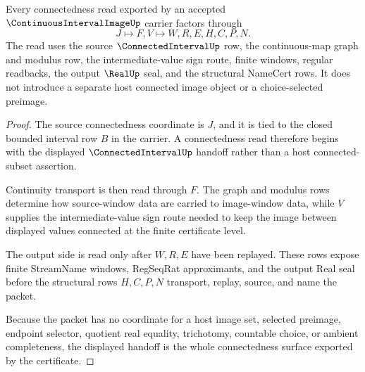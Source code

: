 \begin{theorem}
\label{thm:continuous-interval-image-connected-handoff}
Every connectedness read exported by an accepted $\ContinuousIntervalImageUp$ carrier factors through
$$
J \longmapsto F,V \longmapsto W,R,E,H,C,P,N .
$$
The read uses the source $\ConnectedIntervalUp$ row, the continuous-map graph and modulus row, the intermediate-value sign route, finite windows, regular readbacks, the output $\RealUp$ seal, and the structural NameCert rows. It does not introduce a separate host connected image object or a choice-selected preimage.
\end{theorem}
\begin{proof}
The source connectedness coordinate is $J$, and it is tied to the closed bounded interval row $B$ in the carrier. A connectedness read therefore begins with the displayed $\ConnectedIntervalUp$ handoff rather than a host connected-subset assertion.

Continuity transport is then read through $F$. The graph and modulus rows determine how source-window data are carried to image-window data, while $V$ supplies the intermediate-value sign route needed to keep the image between displayed values connected at the finite certificate level.

The output side is read only after $W,R,E$ have been replayed. These rows expose finite StreamName windows, RegSeqRat approximants, and the output Real seal before the structural rows $H,C,P,N$ transport, replay, source, and name the packet.

Because the packet has no coordinate for a host image set, selected preimage, endpoint selector, quotient real equality, trichotomy, countable choice, or ambient completeness, the displayed handoff is the whole connectedness surface exported by the certificate.
\end{proof}



